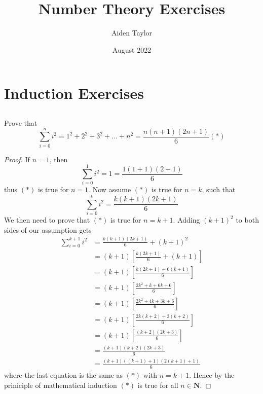 \documentclass{article}
\title{Number Theory Exercises}
\author{Aiden Taylor}
\date{August 2022}
\begin{document}

\section{Induction Exercises}
\subsection{}
Prove that
\[
	\sum_{i=0}^{n} i^2 = 1^2 + 2^2 + 3^2 + ... + n^2 = \frac{n(n+1)(2n+1)}{6} (*)
\]
\begin{proof}
	If $n=1$, then
	\[
		\sum_{i=0}^{1} i^2 = 1 = \frac{1(1+1)(2+1)}{6}
	\]
	thus $(*)$ is true for $n=1$.
	\newline\newline
	Now assume $(*)$ is true for $n = k$, such that
	\[
		\sum_{i=0}^{k} i^2 = \frac{k(k+1)(2k+1)}{6}
	\]
	We then need to prove that $(*)$ is true for $n=k+1$. Adding $(k+1)^2$ to both sides of our assumption gets 
	\begin{align*}
		\sum_{i=0}^{k+1} i^2 & = \frac{k(k+1)(2k+1)}{6} + (k+1)^2 \\
				     & = (k+1) \left[ \frac{k(2k+1)}{6} + (k+1) \right] \\
				     & = (k+1) \left[ \frac{k(2k+1) + 6(k+1)}{6} \right] \\
				     & = (k+1) \left[ \frac{2k^2 + k + 6k + 6}{6} \right] \\
				     & = (k+1) \left[ \frac{2k^2 + 4k + 3k + 6}{6} \right] \\
				     & = (k+1) \left[ \frac{2k(k+2) + 3(k+2)}{6} \right] \\
				     & = (k+1) \left[ \frac{(k+2)(2k+3)}{6} \right] \\
				     & = \frac{(k+1)(k+2)(2k+3)}{6} \\
				     & = \frac{(k+1)((k+1)+1)(2(k+1)+1)}{6}
	\end{align*}
	where the last equation is the same as $(*)$ with $n=k+1$. Hence by the priniciple of mathematical induction $(*)$ is true for all $n \in \mathbf{N}$.
\end{proof}
\end{document}
